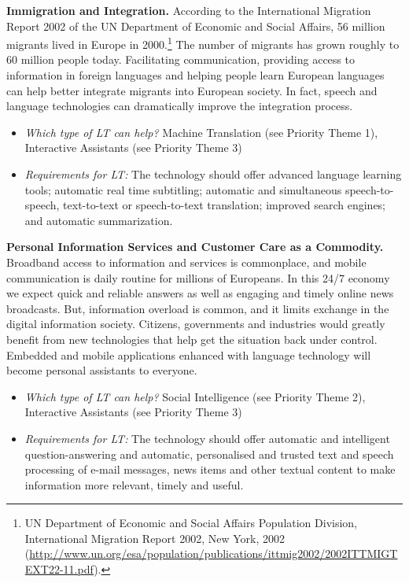 \documentclass[10pt, plain]{../../metanetpaper}
\begin{document}
\begin{multicols}{2}
\textbf{Immigration and Integration.} According to the International Migration Report 2002 of the UN Department of Economic and Social Affairs, 56 million migrants lived in Europe in 2000.\footnote{UN Department of Economic and Social Affairs Population Division, International Migration Report 2002, New York, 2002 (\url{http://www.un.org/esa/population/publications/ittmig2002/2002ITTMIGTEXT22-11.pdf}).}  The number of migrants has grown roughly to 60 million people today. Facilitating communication, providing access to information in foreign languages and helping people learn European languages can help better integrate migrants into European society. In fact, speech and language technologies can dramatically improve the integration process. 

\begin{itemize}
\item \emph{Which type of LT can help?} Machine Translation (see Priority Theme 1), Interactive Assistants (see Priority Theme 3)
\item \emph{Requirements for LT:} The technology should offer advanced language learning tools; automatic real time subtitling; automatic and simultaneous speech-to-speech, text-to-text or speech-to-text translation; improved search engines; and automatic summarization.
\end{itemize}

\textbf{Personal Information Services and Customer Care as a Commodity.} Broadband access to information and services is commonplace, and mobile communication is daily routine for millions of Europeans. In this 24/7 economy we expect quick and reliable answers as well as engaging and timely online news broadcasts. But, information overload is common, and it limits exchange in the digital information society. Citizens, governments and industries would greatly benefit from new technologies that help get the situation back under control. Embedded and mobile applications enhanced with language technology will become personal assistants to everyone.

\begin{itemize}
\item \emph{Which type of LT can help?} Social Intelligence (see Priority Theme 2), Interactive Assistants (see Priority Theme 3)
\item \emph{Requirements for LT:} The technology should offer automatic and intelligent question-answering and automatic, personalised and trusted text and speech processing of e-mail messages, news items and other textual content to make information more relevant, timely and useful.
\end{itemize}


\end{multicols}
\end{document}
